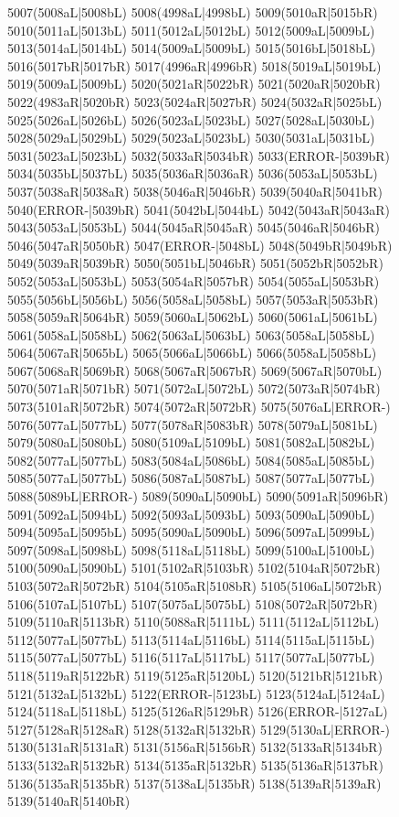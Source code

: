5007(5008aL|5008bL) 5008(4998aL|4998bL) 5009(5010aR|5015bR) 5010(5011aL|5013bL) 5011(5012aL|5012bL) 5012(5009aL|5009bL) \\5013(5014aL|5014bL) 5014(5009aL|5009bL) 5015(5016bL|5018bL) 5016(5017bR|5017bR) 5017(4996aR|4996bR) 5018(5019aL|5019bL) 5019(5009aL|5009bL) 5020(5021aR|5022bR) 5021(5020aR|5020bR) \\5022(4983aR|5020bR) 5023(5024aR|5027bR) 5024(5032aR|5025bL) 5025(5026aL|5026bL) 5026(5023aL|5023bL) 5027(5028aL|5030bL) 5028(5029aL|5029bL) 5029(5023aL|5023bL) 5030(5031aL|5031bL) \\5031(5023aL|5023bL) 5032(5033aR|5034bR) 5033(ERROR-|5039bR) 5034(5035bL|5037bL) 5035(5036aR|5036aR) 5036(5053aL|5053bL) 5037(5038aR|5038aR) 5038(5046aR|5046bR) 5039(5040aR|5041bR) \\5040(ERROR-|5039bR) 5041(5042bL|5044bL) 5042(5043aR|5043aR) 5043(5053aL|5053bL) 5044(5045aR|5045aR) 5045(5046aR|5046bR) 5046(5047aR|5050bR) 5047(ERROR-|5048bL) 5048(5049bR|5049bR) \\5049(5039aR|5039bR) 5050(5051bL|5046bR) 5051(5052bR|5052bR) 5052(5053aL|5053bL) 5053(5054aR|5057bR) 5054(5055aL|5053bR) 5055(5056bL|5056bL) 5056(5058aL|5058bL) 5057(5053aR|5053bR) \\5058(5059aR|5064bR) 5059(5060aL|5062bL) 5060(5061aL|5061bL) 5061(5058aL|5058bL) 5062(5063aL|5063bL) 5063(5058aL|5058bL) 5064(5067aR|5065bL) 5065(5066aL|5066bL) 5066(5058aL|5058bL) \\5067(5068aR|5069bR) 5068(5067aR|5067bR) 5069(5067aR|5070bL) 5070(5071aR|5071bR) 5071(5072aL|5072bL) 5072(5073aR|5074bR) 5073(5101aR|5072bR) 5074(5072aR|5072bR) 5075(5076aL|ERROR-) \\5076(5077aL|5077bL) 5077(5078aR|5083bR) 5078(5079aL|5081bL) 5079(5080aL|5080bL) 5080(5109aL|5109bL) 5081(5082aL|5082bL) 5082(5077aL|5077bL) 5083(5084aL|5086bL) 5084(5085aL|5085bL) \\5085(5077aL|5077bL) 5086(5087aL|5087bL) 5087(5077aL|5077bL) 5088(5089bL|ERROR-) 5089(5090aL|5090bL) 5090(5091aR|5096bR) 5091(5092aL|5094bL) 5092(5093aL|5093bL) 5093(5090aL|5090bL) \\5094(5095aL|5095bL) 5095(5090aL|5090bL) 5096(5097aL|5099bL) 5097(5098aL|5098bL) 5098(5118aL|5118bL) 5099(5100aL|5100bL) 5100(5090aL|5090bL) 5101(5102aR|5103bR) 5102(5104aR|5072bR) \\5103(5072aR|5072bR) 5104(5105aR|5108bR) 5105(5106aL|5072bR) 5106(5107aL|5107bL) 5107(5075aL|5075bL) 5108(5072aR|5072bR) 5109(5110aR|5113bR) 5110(5088aR|5111bL) 5111(5112aL|5112bL) \\5112(5077aL|5077bL) 5113(5114aL|5116bL) 5114(5115aL|5115bL) 5115(5077aL|5077bL) 5116(5117aL|5117bL) 5117(5077aL|5077bL) 5118(5119aR|5122bR) 5119(5125aR|5120bL) 5120(5121bR|5121bR) \\5121(5132aL|5132bL) 5122(ERROR-|5123bL) 5123(5124aL|5124aL) 5124(5118aL|5118bL) 5125(5126aR|5129bR) 5126(ERROR-|5127aL) 5127(5128aR|5128aR) 5128(5132aR|5132bR) 5129(5130aL|ERROR-) \\5130(5131aR|5131aR) 5131(5156aR|5156bR) 5132(5133aR|5134bR) 5133(5132aR|5132bR) 5134(5135aR|5132bR) 5135(5136aR|5137bR) 5136(5135aR|5135bR) 5137(5138aL|5135bR) 5138(5139aR|5139aR) \\5139(5140aR|5140bR) 